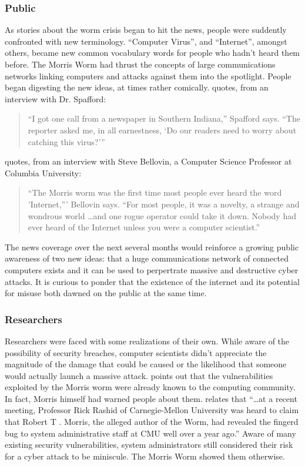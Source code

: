 \subsubsection*{Public}
As stories about the worm crisis began to hit the news, people were suddently
confronted with new terminology. ``Computer Virus'', and ``Internet'', amongst
others, became new common vocabulary words for people who hadn't heard them
before. The Morris Worm had thrust the concepts of large communications networks
linking computers and attacks against them into the spotlight. People
began digesting the new ideas, at times rather comically.
\cite{lee_washpost_2013} quotes, from an
interview with Dr. Spafford:
\begin{quote}
``I got one call from a newspaper in Southern Indiana,'' Spafford says. ``The
reporter asked me, in all earnestness, `Do our readers need to worry about
catching this virus?'''
\end{quote}
\cite{marsan_morris_2008} quotes, from an
interview with Steve Bellovin, a Computer Science Professor at Columbia
University:
\begin{quote}
``The Morris worm was the first time most people ever heard the word 'Internet,'''
Bellovin says. ``For most people, it was a novelty, a strange and wondrous
world \ldots and one rogue operator could take it down. Nobody had ever heard
of the Internet unless you were a computer scientist.''
\end{quote}
The news coverage over the next several months would reinforce a growing public
awareness of two new ideas: that a huge communications network of connected
computers exists and it can be used to perpertrate massive and destructive
cyber attacks.
It is curious to ponder that the existence of the internet and its
potential for misuse both dawned on the public at the same time.
           	
\subsubsection*{Researchers}
Researchers were faced with some realizations of their own. While aware of the
possibility of security breaches, computer scientists didn't appreciate the
magnitude of the damage that could be caused or the likelihood that someone
would actually launch a massive attack. \cite{seeley_tour_1989} points out that
the vulnerabilities exploited by the Morris worm were already known to the
computing community. In fact, Morris himself had warned people about them.
\cite{spafford_internet_1989} relates that ``\ldots at a recent meeting, 
Professor Rick Rashid of Carnegie-Mellon University was heard to claim that
Robert T . Morris, the alleged author of the Worm, had revealed the fingerd
bug to system administrative staff at CMU well over a year ago.'' Aware of many
existing security vulnerabilities, system administrators still considered
their risk for a cyber attack to be miniscule. The Morris Worm showed
them otherwise. 

